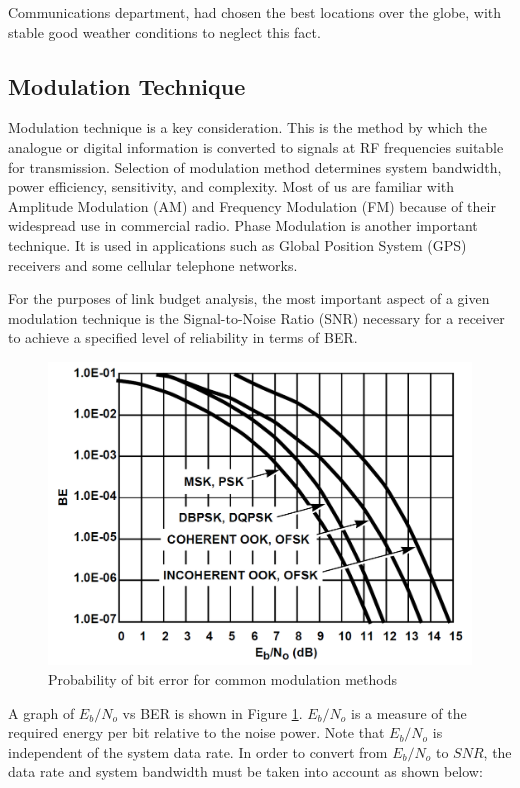 Communications department, had chosen the best locations over the globe, with stable good weather conditions to neglect this fact.

\subsection{Modulation Technique}
Modulation technique is a key consideration. This is the method by which the analogue or digital information is converted to signals at RF frequencies suitable for transmission. Selection of modulation method determines system bandwidth, power efficiency, sensitivity, and complexity. Most of us are familiar with Amplitude Modulation (AM) and Frequency Modulation (FM) because of their widespread use in commercial radio. Phase Modulation is another important technique. It is used in applications such as Global Position System (GPS) receivers and some cellular telephone networks. \cite{Note1998}

For the purposes of link budget analysis, the most important aspect of a given modulation technique is the Signal-to-Noise Ratio (SNR) necessary for a receiver to achieve a specified level of reliability in terms of BER.

\begin{figure}[H]
	\includegraphics[scale=0.3]{./sections/SatelliteDept/sections/images/BEvsSNR}
	\centering
	\caption[Probability of bit error for common modulation methods]{Probability of bit error for common modulation methods \cite{Note1998}}
	\label{BEvsSNR}
\end{figure}

A graph of $E_b/N_o$ vs BER is shown in Figure \ref{BEvsSNR}. $E_b/N_o$ is a measure of the required energy per bit relative to the noise power. Note that $E_b/N_o$ is independent of the system data rate. In order to convert from $E_b/N_o$ to $SNR$, the data rate and system bandwidth must be taken into account as shown below:


